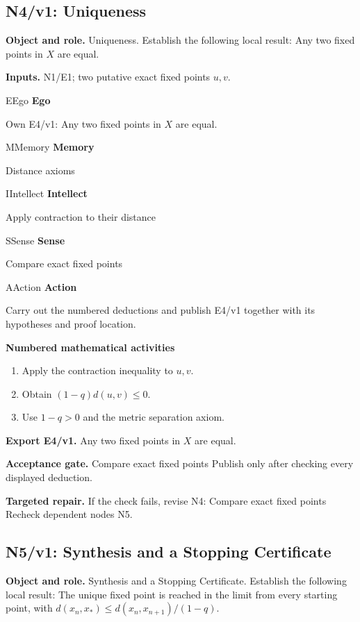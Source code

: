 \documentclass[preprint,12pt,aps,pra,showkeys,amsmath,amssymb,superscriptaddress,floatfix]{revtex4-2}
\theoremstyle{definition}
\theoremstyle{remark}
\newcommand{\mmfaculty}[3]{%
 \begin{mmfacultybox}{#1}{#2}
 {\sffamily\bfseries\color{MMBlue}#2}\par\smallskip #3
 \end{mmfacultybox}}
\newcommand{\field}[2]{\par\smallskip\noindent\textbf{#1.} #2\par}
\begin{document}
\clearpage

\subsection{N4/v1: Uniqueness}

\field{Object and role}{Uniqueness. Establish the following local result: Any two fixed points
in \(X\) are equal.}

\field{Inputs}{N1/E1; two putative exact fixed points \(u,v\).}

\mmfaculty{E}{Ego}{Own E4/v1: Any two fixed points in \(X\) are equal.}

\mmfaculty{M}{Memory}{Distance axioms}

\mmfaculty{I}{Intellect}{Apply contraction to their distance}

\mmfaculty{S}{Sense}{Compare exact fixed points}

\mmfaculty{A}{Action}{Carry out the numbered deductions and publish E4/v1 together with its
hypotheses and proof location.}

\smallskip\noindent\textbf{Numbered mathematical activities}

\begin{enumerate}[label=N4.\arabic*,leftmargin=3.4em]

\item Apply the contraction inequality to \(u,v\).

\item Obtain \((1-q)d(u,v)\le0\).

\item Use \(1-q>0\) and the metric separation axiom.

\end{enumerate}

\field{Export E4/v1}{Any two fixed points in \(X\) are equal.}

\field{Acceptance gate}{Compare exact fixed points Publish only after checking every displayed
deduction.}

\field{Targeted repair}{If the check fails, revise N4: Compare exact fixed points Recheck
dependent nodes N5.}

\clearpage

\subsection{N5/v1: Synthesis and a Stopping Certificate}

\field{Object and role}{Synthesis and a Stopping Certificate. Establish the following local
result: The unique fixed point is reached in the limit from every
starting point, with \(d(x_n,x_*)\le d(x_n,x_{n+1})/(1-q)\).}
\end{document}
